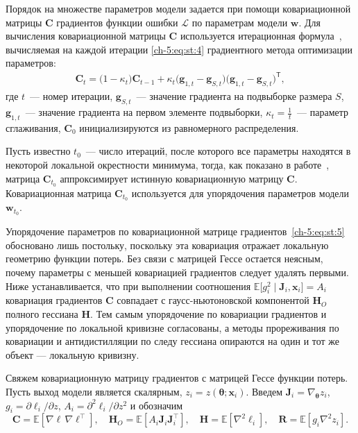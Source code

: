 Порядок на множестве параметров модели задается при помощи ковариационной матрицы $\mathbf{C}$ градиентов функции ошибки $\mathcal{L}$ по параметрам модели $\textbf{w}$. Для вычисления ковариационной матрицы $\mathbf{C}$ используется итерационная формула~\cite{Chunyan2016}, вычисляемая на каждой итерации \eqref{ch-5:eq:st:4} градиентного метода оптимизации параметров:
\begin{equation}
    \label{ch-5:eq:st:5}
    \begin{aligned}
    \mathbf{C}_t = \bigl(1-\kappa_t\bigr)\mathbf{C}_{t-1}+\kappa_t\bigl(\textbf{g}_{1,t}-\textbf{g}_{S,t}\bigr)\bigl(\textbf{g}_{1,t}-\textbf{g}_{S,t}\bigr)^{\mathsf{T}},
    \end{aligned}
\end{equation}
 где $t$~--- номер итерации, $\textbf{g}_{S,t}$~--- значение градиента на подвыборке размера $S$, $\textbf{g}_{1,t}$~--- значение градиента на первом элементе подвыборки, $\kappa_t=\frac{1}{t}$~--- параметр сглаживания, $\mathbf{C}_0$ инициализируются из равномерного распределения.

Пусть известно $t_0$~--- число итераций, после которого все параметры находятся в некоторой локальной окрестности минимума, тогда, как показано в работе~\cite{Chunyan2016}, матрица $\mathbf{C}_{t_0}$ аппроксимирует истинную ковариационную матрицу $\mathbf{C}$. Ковариационная матрица $\mathbf{C}_{t_0}$ используется для упорядочения параметров модели $\textbf{w}_{t_0}$.

Упорядочение параметров по ковариационной матрице градиентов~\eqref{ch-5:eq:st:5} обосновано лишь постольку, поскольку эта ковариация отражает локальную геометрию функции потерь.
Без связи с матрицей Гессе остается неясным, почему параметры с меньшей ковариацией градиентов следует удалять первыми.
Ниже устанавливается, что при выполнении соотношения $\mathbb{E}\bigl[g_i^2\mid\mathbf{J}_i,\mathbf{x}_i\bigr]=A_i$ ковариация градиентов $\mathbf{C}$ совпадает с гаусс-ньютоновской компонентой $\mathbf{H}_O$ полного гессиана $\mathbf{H}$.
Тем самым упорядочение по ковариации градиентов и упорядочение по локальной кривизне согласованы, а методы прореживания по ковариации и антидистилляции по следу гессиана опираются на один и тот же объект --- локальную кривизну.

Свяжем ковариационную матрицу градиентов с матрицей Гессе функции потерь.
Пусть выход модели является скалярным, $z_i=z(\boldsymbol{\theta};\mathbf{x}_i)$.
Введем $\mathbf{J}_i=\nabla_{\boldsymbol{\theta}}z_i$, $g_i=\partial\ell_i/\partial z$, $A_i=\partial^2\ell_i/\partial z^2$ и обозначим
\[
  \mathbf{C}=\mathbb{E}[\nabla\ell\,\nabla\ell^{\top}],\quad
  \mathbf{H}_O=\mathbb{E}[A_i\mathbf{J}_i\mathbf{J}_i^{\top}],\quad
  \mathbf{H}=\mathbb{E}[\nabla^2\ell_i],\quad
  \mathbf{R}=\mathbb{E}[g_i\nabla^2z_i].
\]

